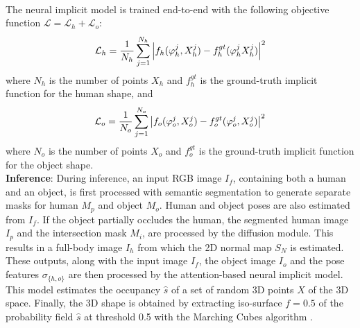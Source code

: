\\The neural implicit model is trained end-to-end with the following objective function $\mathcal{L}=\mathcal{L}_{h}+\mathcal{L}_{o}$:
\vspace{-0.2cm}
\begin{equation}
    \mathcal{L}_{h}=\frac{1}{N_h}\sum_{j=1}^{N_h}\left|f_{h}(\varphi^j_h, X^j_h)-f_{h}^{gt}(\varphi^j_h X^j_h)\right|^2
\vspace{-0.2cm}
\end{equation}
where $N_h$ is the number of points $X_h$ and $f_{h}^{gt}$ is the ground-truth implicit function for the human shape, and 
\vspace{-0.2cm}
\begin{equation}
    \mathcal{L}_{o}=\frac{1}{N_o}\sum_{j=1}^{N_o}\left|f_{o}(\varphi^j_o, X^j_o)-f_{o}^{gt}(\varphi^j_o, X^j_o)\right|^2
\vspace{-0.2cm}
\end{equation}
where $N_o$ is the number of points $X_o$ and $f_{o}^{gt}$ is the ground-truth implicit function for the object shape. 
%
\\\textbf{Inference}: During inference, an input RGB image $I_f$, containing both a human and an object, is first processed with semantic segmentation to generate separate masks for human $M_p$ and object $M_o$. Human and object poses are also estimated from $I_f$. If the object partially occludes the human, the segmented human image $I_p$ and the intersection mask $M_i$, are processed by the diffusion module. This results in a full-body image $I_h$ from which the 2D normal map $S_N$ is estimated. These outputs, along with the input image $I_f$, the object image $I_o$ and the pose features $\sigma_{\{h,o\}}$ are then processed by the attention-based neural implicit model. This model estimates the occupancy $\hat{s}$ of a set of random 3D points $X$ of the 3D space. Finally, the 3D shape is obtained by extracting iso-surface $f = 0.5$ of the probability field $\hat{s}$ at threshold 0.5 with the Marching Cubes algorithm \cite{lorensen1987marching}.

